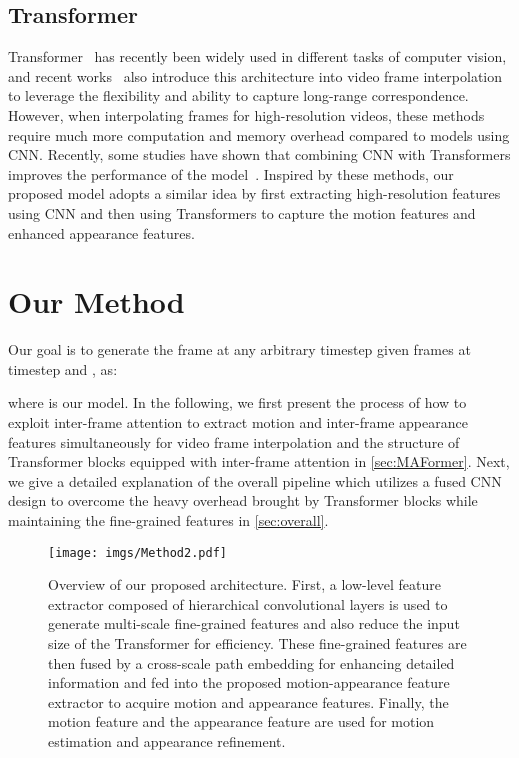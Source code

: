 \documentclass[10pt,twocolumn,letterpaper]{article}
\begin{document}
\subsection{Transformer}
        Transformer~\cite{vaswani2017attention} has recently been widely used in different tasks of computer vision, and recent works~\cite{shi2022video,lu2022video} also introduce this architecture into video frame interpolation to leverage the flexibility and ability to capture long-range correspondence. However, when interpolating frames for high-resolution videos, these methods require much more computation and memory overhead compared to models using CNN. Recently, some studies have shown that combining CNN with Transformers improves the performance of the model~\cite{wang2022convolutional,d2021convit,dai2021coatnet,li2021localvit,wu2021cvt,xiao2021early,yuan2021incorporating}. Inspired by these methods, our proposed model adopts a similar idea by first extracting high-resolution features using CNN and then using Transformers to capture the motion features and enhanced appearance features.
	
\section{Our Method}
 
	Our goal is to generate the frame   at any arbitrary timestep  given frames  at timestep  and , as:
    
    where  is our model. In the following, we first present the process of how to exploit inter-frame attention to extract motion and inter-frame appearance features simultaneously for video frame interpolation and the structure of Transformer blocks equipped with inter-frame attention in \cref{sec:MAFormer}. Next, we give a detailed explanation of the overall pipeline which utilizes a fused CNN design to overcome the heavy overhead brought by Transformer blocks while maintaining the fine-grained features in \cref{sec:overall}.
    
        \begin{figure*}[t]
		\centering
			\texttt{[image: imgs/Method2.pdf]}
\caption{Overview of our proposed architecture. First, a low-level feature extractor composed of hierarchical convolutional layers is used to generate multi-scale fine-grained features and also reduce the input size of the Transformer for efficiency. These fine-grained features are then fused by a cross-scale path embedding for enhancing detailed information and fed into the proposed motion-appearance feature extractor to acquire motion and appearance features. Finally, the motion feature and the appearance feature are used for motion estimation and appearance refinement.}
		\label{fig:overall}
		\vspace{-0.25in}
	\end{figure*}
 
\end{document}
